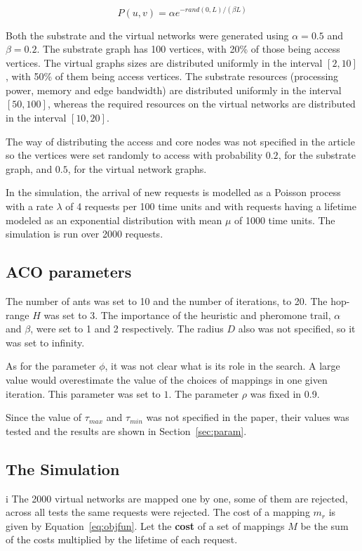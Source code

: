 \documentclass[10pt, a4paper, twocolumn]{article}
\begin{document}
\begin{equation}
  P(u,v) = \alpha e^{-rand(0,L)/(\beta L)} \label{waxman}
\end{equation}

Both the substrate and the virtual networks were generated using $\alpha = 0.5$ and $\beta = 0.2$. The substrate graph has 100 vertices, with 20\% of those being access vertices. The virtual graphs sizes are distributed uniformly in the interval $[2,10]$, with 50\% of them being access vertices. The substrate resources (processing power, memory and edge bandwidth) are distributed uniformly in the interval $[50,100]$, whereas the required resources on the virtual networks are distributed in the interval $[10,20]$.

The way of distributing the access and core nodes was not specified in the article so the vertices were set randomly to access with probability $0.2$, for the substrate graph, and $0.5$, for the virtual network graphs.

In the simulation, the arrival of new requests is modelled as a Poisson process with a rate $\lambda$ of 4 requests per 100 time units and with requests having a lifetime modeled as an exponential distribution with mean $\mu$ of 1000 time units. The simulation is run over 2000 requests.

\subsection{ACO parameters}
The number of ants was set to 10 and the number of iterations, to 20. The hop-range $H$ was set to 3. The importance of the heuristic and pheromone trail, $\alpha$ and $\beta$, were set to 1 and 2 respectively. The radius $D$ also was not specified, so it was set to infinity.

As for the parameter $\phi$, it was not clear what is its role in the search. A large value would overestimate the value of the choices of mappings in one given iteration. This parameter was set to $1$. The parameter $\rho$ was fixed in 0.9.

Since the value of $\tau_{max}$ and $\tau_{min}$ was not specified in the paper, their values was tested and the results are shown in Section~\ref{sec:param}.

\subsection{The Simulation}i
The 2000 virtual networks are mapped one by one, some of them are rejected, across all tests the same requests were rejected. The cost of a mapping $m_{r}$ is given by Equation~\ref{eq:objfun}. Let the \textbf{cost} of a set of mappings $M$ be the sum of the costs multiplied by the lifetime of each request.
\end{document}
